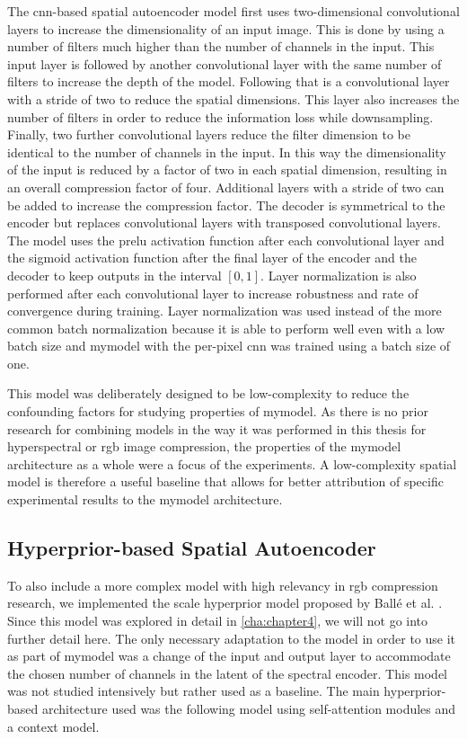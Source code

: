 The \ac{cnn}-based spatial autoencoder model first uses two-dimensional convolutional layers to increase the dimensionality of an input image. This is done by using a number of filters much higher than the number of channels in the input. This input layer is followed by another convolutional layer with the same number of filters to increase the depth of the model. Following that is a convolutional layer with a stride of two to reduce the spatial dimensions. This layer also increases the number of filters in order to reduce the information loss while downsampling. Finally, two further convolutional layers reduce the filter dimension to be identical to the number of channels in the input. In this way the dimensionality of the input is reduced by a factor of two in each spatial dimension, resulting in an overall compression factor of four. Additional layers with a stride of two can be added to increase the compression factor. The decoder is symmetrical to the encoder but replaces convolutional layers with transposed convolutional layers. The model uses the \ac{prelu} activation function after each convolutional layer and the sigmoid activation function after the final layer of the encoder and the decoder to keep outputs in the interval $[0,1]$. Layer normalization \citep{ba_layer_2016} is also performed after each convolutional layer to increase robustness and rate of convergence during training. Layer normalization was used instead of the more common batch normalization because it is able to perform well even with a low batch size and \ac{mymodel} with the per-pixel \ac{cnn} was trained using a batch size of one.

This model was deliberately designed to be low-complexity to reduce the confounding factors for studying properties of \ac{mymodel}. As there is no prior research for combining models in the way it was performed in this thesis for hyperspectral or \ac{rgb} image compression, the properties of the \ac{mymodel} architecture as a whole were a focus of the experiments. A low-complexity spatial model is therefore a useful baseline that allows for better attribution of specific experimental results to the \ac{mymodel} architecture.
\subsection{Hyperprior-based Spatial Autoencoder}
To also include a more complex model with high relevancy in \ac{rgb} compression research, we implemented the scale hyperprior model proposed by Ballé et al. \citep{balle_end--end_2017}. Since this model was explored in detail in \autoref{cha:chapter4}, we will not go into further detail here. The only necessary adaptation to the model in order to use it as part of \ac{mymodel} was a change of the input and output layer to accommodate the chosen number of channels in the latent of the spectral encoder. This model was not studied intensively but rather used as a baseline. The main hyperprior-based architecture used was the following model using self-attention modules and a context model.

